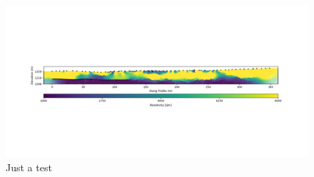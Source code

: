 \documentclass[5p]{elsarticle}
\begin{document}
	\begin{figure}[h]

	\includegraphics[width=\textwidth]{Figures/New_E5_ERT.png}
		\caption{Just a test}

									\end{figure}



\end{document}
